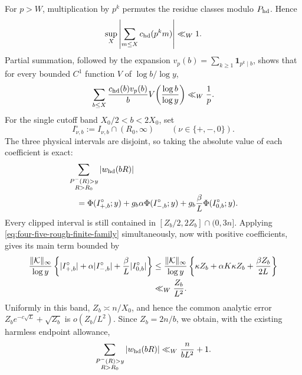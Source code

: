 \documentclass[11pt]{article}
\numberwithin{equation}{section}
\theoremstyle{definition}
\theoremstyle{remark}
\newcommand{\R}{\mathbb R}
\newcommand{\1}{\mathbf 1}
\begin{document}
For \(p>W\), multiplication by \(p^k\) permutes the residue classes
modulo \(P_{\rm hd}\).  Hence
\[
 \sup_X\left|\sum_{m\le X}c_{\rm hd}(p^km)\right|\ll_W1.
\]
Partial summation, followed by the expansion
\(v_p(b)=\sum_{k\ge1}\1_{p^k\mid b}\), shows that for every bounded
\(C^1\) function \(V\) of \(\log b/\log y\),
\begin{equation}
 \sum_{b\le X}\frac{c_{\rm hd}(b)v_p(b)}b
       V\!\left(\frac{\log b}{\log y}\right)
 \ll_W\frac1p.
 \label{eq:periodic-prime-power-sum}
\end{equation}
For the single cutoff band \(X_0/2<b<2X_0\), set
\[
 I_{\nu,b}^{\circ}:=I_{\nu,b}\cap(R_0,\infty)
 \qquad(\nu\in\{+,-,0\}).
\]
The three physical intervals are disjoint, so taking the absolute value
of each coefficient is exact:
\begin{align}
 &\sum_{\substack{P^-(R)>y\\R>R_0}}|w_{\rm hd}(bR)|\notag\\
 &\quad=\Phi(I_{+,b}^{\circ};y)
      +g_b\alpha\Phi(I_{-,b}^{\circ};y)
      +g_b\frac\beta L\Phi(I_{0,b}^{\circ};y).
 \label{eq:rough-cutoff-three-intervals}
\end{align}
Every clipped interval is still contained in
\([Z_b/2,2Z_b]\cap(0,3n]\).  Applying
\eqref{eq:four-five-rough-finite-family} simultaneously, now with
positive coefficients, gives its main term bounded by
\begin{align}
 \frac{\|\mathcal K\|_\infty}{\log y}
 \left\{|I_{+,b}^{\circ}|+\alpha|I_{-,b}^{\circ}|
       +\frac\beta L|I_{0,b}^{\circ}|\right\}
 &\le\frac{\|\mathcal K\|_\infty}{\log y}
 \left\{\kappa Z_b+\alpha K\kappa Z_b
       +\frac{\beta Z_b}{2L}\right\}\notag\\
 &\ll_W\frac{Z_b}{L^2}.
 \label{eq:rough-cutoff-weighted-length}
\end{align}
Uniformly in this band, \(Z_b\asymp n/X_0\), and hence the common
analytic error \(Z_be^{-c\sqrt L}+\sqrt{Z_b}\) is
\(o(Z_b/L^2)\).  Since \(Z_b=2n/b\), we obtain, with the existing
harmless endpoint allowance,
\begin{equation}
 \sum_{\substack{P^-(R)>y\\R>R_0}}|w_{\rm hd}(bR)|
 \ll_W\frac{n}{bL^2}+1.
 \label{eq:exceptional-cutoff-band}
\end{equation}
\end{document}
